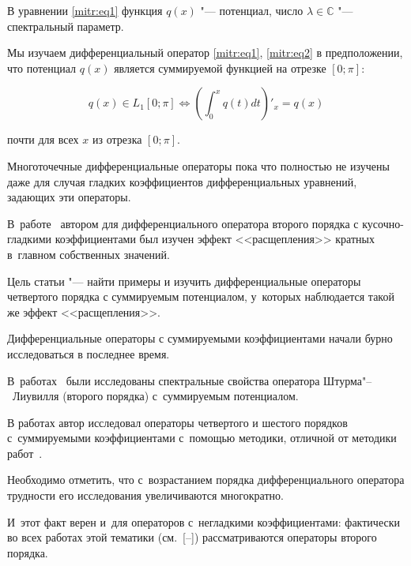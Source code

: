 В уравнении \eqref{mitr:eq1} функция $q(x)$  "---  потенциал,  число $\lambda\in\mathbb{C}$ "--- спектральный параметр. 

Мы изучаем дифференциальный оператор \eqref{mitr:eq1}, \eqref{mitr:eq2}  в предположении, что потенциал $q(x)$ является суммируемой функцией на отрезке $[0; \pi]$:

\begin{equation}

\label{mitr:eq3}

q(x)\in L_1[0;\pi]\Leftrightarrow \left(\int^x_0 q(t) dt\right)'_x=q(x)


\end{equation}

почти для всех $x$ из отрезка $[0; \pi]$.



Многоточечные дифференциальные операторы пока что полностью не изучены даже для случая гладких коэффициентов дифференциальных уравнений, задающих эти операторы. 

В~работе~\cite{mitr:bib1} автором для дифференциального оператора второго порядка с кусочно-гладкими коэффициентами был изучен эффект <<расщепления>> кратных в~главном собственных значений. 

Цель статьи "--- найти примеры и изучить дифференциальные операторы четвертого порядка с суммируемым потенциалом, у~которых наблюдается такой же эффект <<расщепления>>.



Дифференциальные операторы с суммируемыми коэффициентами начали бурно исследоваться в последнее время. 

В~работах~\cite{mitr:bib2,mitr:bib3} были исследованы спектральные свойства оператора Штурма"--~Лиувилля (второго порядка) с~суммируемым потенциалом.



В работах \cite{mitr:bib4,mitr:bib5} автор исследовал операторы четвертого и шестого порядков с~суммируемыми коэффициентами с~помощью методики, отличной от методики работ~\cite{mitr:bib2,mitr:bib3}. 

Необходимо отметить, что с~возрастанием порядка дифференциального оператора трудности его исследования увеличиваются многократно. 

И~этот факт верен и~для операторов с~негладкими коэффициентами: фактически во всех работах этой тематики (см.~[--]) рассматриваются операторы второго порядка.



